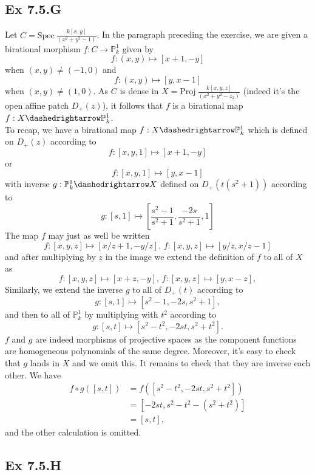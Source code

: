 \documentclass{article}
\theoremstyle{definition}
\renewcommand{\P}{\mathbb{P}}
\newcommand{\Spec}{\text{Spec}}
\newcommand{\Proj}{\text{Proj}}
\begin{document}
\subsection*{Ex 7.5.G}

Let $C = \Spec\ \frac{k[x, y]}{(x^{2} + y^{2} - 1)}$. In the paragraph preceding the
exercise, we are given a birational morphism $f : C \to \P_{k}^{1}$ given by
\[
	f : (x, y) \mapsto [x + 1, -y]
\]
when $(x, y) \not = (-1, 0)$ and
\[
	f : (x, y) \mapsto [y, x - 1]
\]
when $(x, y) \not = (1, 0)$. As $C$ is dense in $X = \Proj\ \frac{k[x, y,
				z]}{(x^{2} + y^{2} - z_{2})}$ (indeed it's the open affine patch $D_{+}(z)$),
it follows that $f$ is a birational map $f : X \dashedrightarrow \P_{k}^{1}$. \\

To recap, we have a birational map $f : X \dashedrightarrow \P_{k}^{1}$
which is defined on $D_{+}(z)$ according to
\[
	f : [x, y, 1] \mapsto [x + 1, - y]
\]
or
\[
	f : [x, y, 1] \mapsto [y, x - 1]
\]
with inverse $g : \P_{k}^{1} \dashedrightarrow X$ defined on $D_{+}(t(s^{2} + 1))$ according to
\[
	g : [s, 1]
	\mapsto
	\left[
		\frac{s^{2} - 1}{s^{2} + 1},
		\frac{-2s}{s^{2} + 1},
		1
		\right]
\]
The map $f$ may just as well be written
\[
	f : [x, y, z] \mapsto [x/z + 1, - y/z],\,
	f : [x, y, z] \mapsto [y/z, x/z - 1]
\]
and after multiplying by $z$ in the image we extend the definition of $f$ to all of $X$ as
\[
	f : [x, y, z] \mapsto [x + z, - y],\,
	f : [x, y, z] \mapsto [y, x - z],
\]
Similarly, we extend the inverse $g$ to all of $D_{+}(t)$ according to
\[
	g : [s, 1]
	\mapsto
	\left[
		s^{2} - 1,
		-2s,
		s^{2} + 1
		\right],
\]
and then to all of $\P_{k}^{1}$ by multiplying with $t^{2}$ according to
\[
	g : [s, t]
	\mapsto
	\left[
		s^{2} - t^{2},
		-2st,
		s^{2} + t^{2}
		\right].
\]
$f$ and $g$ are indeed morphisms of projective spaces as the component
functions are homogeneous polynomials of the same degree. Moreover, it's easy
to check that $g$ lands in $X$ and we omit this. It remains to check that they
are inverse each other. We have
\begin{align*}
	f \circ g ([s, t])
	 & =
	f \left(\left[
		s^{2} - t^{2},
		-2st,
		s^{2} + t^{2}
	\right]\right) \\
	 & =
	\left[
		-2st,
		s^{2} - t^{2} -
		(s^{2} + t^{2})
	\right]        \\
	 & =
	\left[
		s,
		t
		\right],
\end{align*}
and the other calculation is omitted.


\subsection*{Ex 7.5.H}
\end{document}
